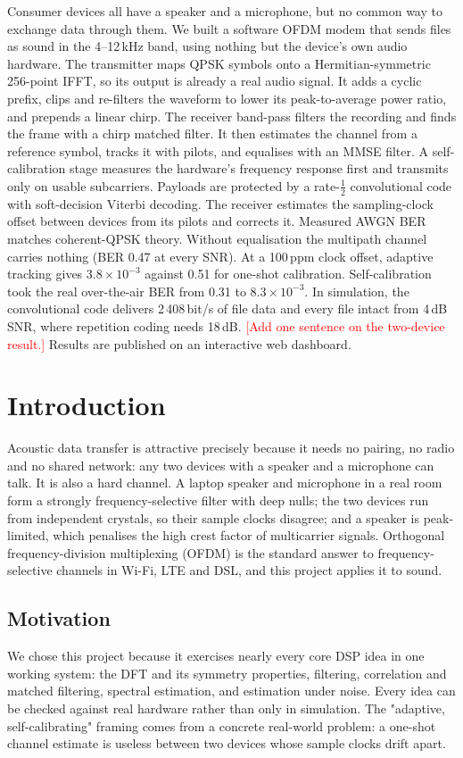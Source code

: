 \documentclass[11pt,a4paper]{report}
\newcommand{\fillin}[1]{\textcolor{red}{[#1]}}
\begin{document}
Consumer devices all have a speaker and a microphone, but no common way to exchange
data through them. We built a software OFDM modem that sends files as sound in the
4--12\,kHz band, using nothing but the device's own audio hardware. The transmitter
maps QPSK symbols onto a Hermitian-symmetric 256-point IFFT, so its output is already
a real audio signal. It adds a cyclic prefix, clips and re-filters the waveform to
lower its peak-to-average power ratio, and prepends a linear chirp. The receiver
band-pass filters the recording and finds the frame with a chirp matched filter.
It then estimates the channel from a reference symbol, tracks it with pilots, and
equalises with an MMSE filter. A self-calibration stage measures the hardware's
frequency response first and transmits only on usable subcarriers. Payloads are
protected by a rate-$\tfrac12$ convolutional code with soft-decision Viterbi
decoding. The receiver estimates the sampling-clock offset between devices from its
pilots and corrects it. Measured AWGN BER matches coherent-QPSK theory. Without
equalisation the multipath channel carries nothing (BER 0.47 at every SNR). At a
100\,ppm clock offset, adaptive tracking gives $3.8\times10^{-3}$ against 0.51 for
one-shot calibration. Self-calibration took the real over-the-air BER from 0.31 to
$8.3\times10^{-3}$. In simulation, the convolutional code delivers 2\,408\,bit/s of
file data and every file intact from 4\,dB SNR, where repetition coding needs 18\,dB.
\fillin{Add one sentence on the two-device result.} Results are published on an
interactive web dashboard.

\chapter{Introduction}

Acoustic data transfer is attractive precisely because it needs no pairing, no
radio and no shared network: any two devices with a speaker and a microphone can
talk. It is also a hard channel. A laptop speaker and microphone in a real room form
a strongly frequency-selective filter with deep nulls; the two devices run from
independent crystals, so their sample clocks disagree; and a speaker is
peak-limited, which penalises the high crest factor of multicarrier signals.
Orthogonal frequency-division multiplexing (OFDM) is the standard answer to
frequency-selective channels in Wi-Fi, LTE and DSL, and this project applies it to
sound.

\section{Motivation}
We chose this project because it exercises nearly every core DSP idea in one working
system: the DFT and its symmetry properties, filtering, correlation and matched
filtering, spectral estimation, and estimation under noise. Every idea can be
checked against real hardware rather than only in simulation. The "adaptive,
self-calibrating" framing comes from a concrete real-world problem: a one-shot
channel estimate is useless between two devices whose sample clocks drift apart.
\end{document}

